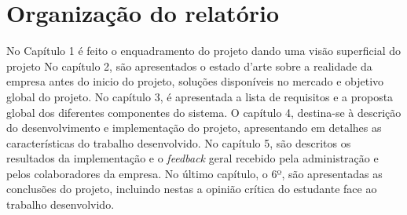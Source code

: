 \section{Organização do relatório}
No Capítulo 1 é feito o enquadramento do projeto dando uma visão superficial do projeto
\newline\newline
No capítulo 2, são apresentados o estado d'arte sobre a realidade da empresa antes do inicio do projeto, soluções disponíveis no mercado e objetivo global do projeto.
\newline\newline
No capítulo 3, é apresentada a lista de requisitos e a proposta global dos diferentes componentes do sistema.
\newline\newline
O capítulo 4, destina-se à descrição do desenvolvimento e implementação do projeto, apresentando em detalhes as características do trabalho desenvolvido.
\newline\newline
No capítulo 5, são descritos os resultados da implementação e o \textit{feedback} geral recebido pela administração e pelos colaboradores da empresa.
\newline\newline
No último capítulo, o 6º, são apresentadas as conclusões do projeto, incluindo nestas a opinião crítica do estudante face ao trabalho desenvolvido.
